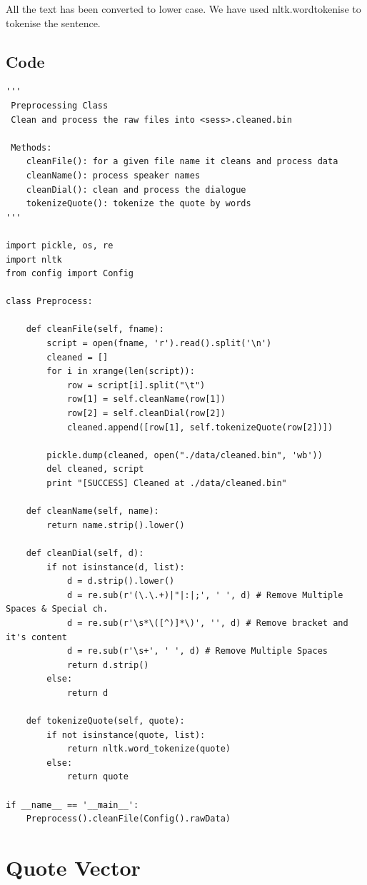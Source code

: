 \documentclass[BTech]{srmuthesis}
\begin{document}
All the text has been converted to lower case. We have used nltk.wordtokenise to tokenise the sentence.

\section{Code}

\begin{verbatim}
'''
 Preprocessing Class
 Clean and process the raw files into <sess>.cleaned.bin

 Methods:
    cleanFile(): for a given file name it cleans and process data
    cleanName(): process speaker names
    cleanDial(): clean and process the dialogue
    tokenizeQuote(): tokenize the quote by words
'''

import pickle, os, re
import nltk
from config import Config

class Preprocess:

    def cleanFile(self, fname):
        script = open(fname, 'r').read().split('\n')
        cleaned = []
        for i in xrange(len(script)):
            row = script[i].split("\t")
            row[1] = self.cleanName(row[1])
            row[2] = self.cleanDial(row[2])
            cleaned.append([row[1], self.tokenizeQuote(row[2])])

        pickle.dump(cleaned, open("./data/cleaned.bin", 'wb'))
        del cleaned, script
        print "[SUCCESS] Cleaned at ./data/cleaned.bin"

    def cleanName(self, name):
        return name.strip().lower()

    def cleanDial(self, d):
        if not isinstance(d, list):
            d = d.strip().lower()
            d = re.sub(r'(\.\.+)|"|:|;', ' ', d) # Remove Multiple Spaces & Special ch.
            d = re.sub(r'\s*\([^)]*\)', '', d) # Remove bracket and it's content
            d = re.sub(r'\s+', ' ', d) # Remove Multiple Spaces
            return d.strip()
        else:
            return d

    def tokenizeQuote(self, quote):
        if not isinstance(quote, list):
            return nltk.word_tokenize(quote)
        else:
            return quote

if __name__ == '__main__':
    Preprocess().cleanFile(Config().rawData)

\end{verbatim}

\chapter{Quote Vector}
\end{document}
